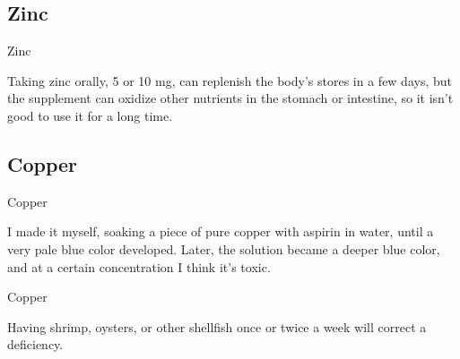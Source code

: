 \documentclass[11pt,oneside,openany,extrafontsizes]{memoir}
\begin{document}
\subsection{Zinc}

\begin{standalonequote}{Zinc}

    \begin{answer}
        Taking zinc orally, 5 or 10 mg, can replenish the body's stores in a few days, but the supplement can oxidize other nutrients in the stomach or intestine, so it isn't good to use it for a long time.
    \end{answer}
\end{standalonequote}

\subsection{Copper}

\begin{standalonequote}{Copper}

    \begin{answer}
        I made it myself, soaking a piece of pure copper with aspirin in water, until a very pale blue color developed. Later, the solution became a deeper blue color, and at a certain concentration I think it's toxic.
    \end{answer}
\end{standalonequote}

\begin{standalonequote}{Copper}

    \begin{answer}
        Having shrimp, oysters, or other shellfish once or twice a week will correct a deficiency.
    \end{answer}
\end{standalonequote}
\end{document}
